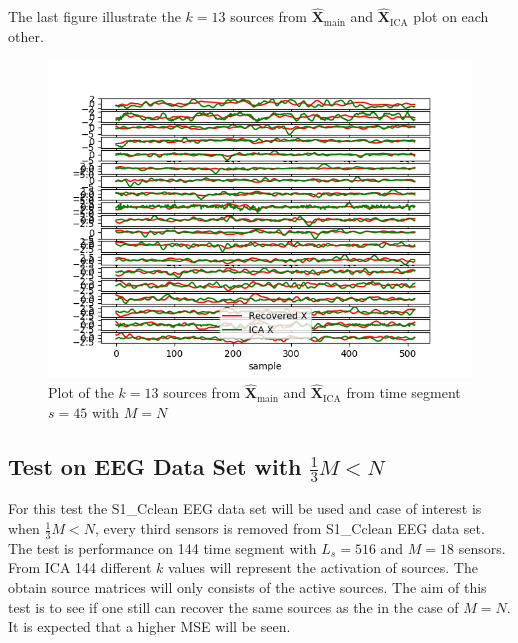 The last figure illustrate the $k = 13$ sources from $\hat{\mathbf{X}}_{\text{main}}$ and $\hat{\mathbf{X}}_{\text{ICA}}$ plot on each other.
\begin{figure}[H]
    \centering
	\includegraphics[scale=0.5]{figures/ch_7/Sources_M=N.png}
	\caption{Plot of the $k = 13$ sources from $\hat{\mathbf{X}}_{\text{main}}$ and $\hat{\mathbf{X}}_{\text{ICA}}$ from time segment $s = 45$ with $M=N$}
	\label{fig:M=N_3}
\end{figure} 
\noindent





\subsection{Test on EEG Data Set with $\frac{1}{3} M<N$}
For this test the S1\_Cclean EEG data set will be used and case of interest is when $\frac{1}{3} M < N$, every third sensors is removed from S1\_Cclean EEG data set. The test is performance on 144 time segment with $L_s = 516$ and $M = 18$ sensors. From ICA 144 different $k$ values will represent the activation of sources. The obtain source matrices will only consists of the active sources.
The aim of this test is to see if one still can recover the same sources as the in the case of $M=N$. It is expected that a higher MSE will be seen.

